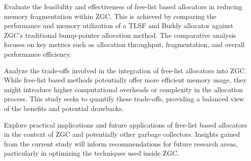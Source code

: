 Evaluate the feasibility and effectiveness of free-list based allocators in reducing memory fragmentation within ZGC. This is achieved by comparing the performance and memory utilization of a TLSF and Buddy allocator against ZGC's traditional bump-pointer allocation method. The comparative analysis focuses on key metrics such as allocation throughput, fragmentation, and overall performance efficiency.

Analyze the trade-offs involved in the integration of free-list allocators into ZGC. While free-list based methods potentially offer more efficient memory usage, they might introduce higher computational overheads or complexity in the allocation process. This study seeks to quantify these trade-offs, providing a balanced view of the benefits and potential drawbacks.

Explore practical implications and future applications of free-list based allocators in the context of ZGC and potentially other garbage collectors. Insights gained from the current study will inform recommendations for future research areas, particularly in optimizing the techniques used inside ZGC.


